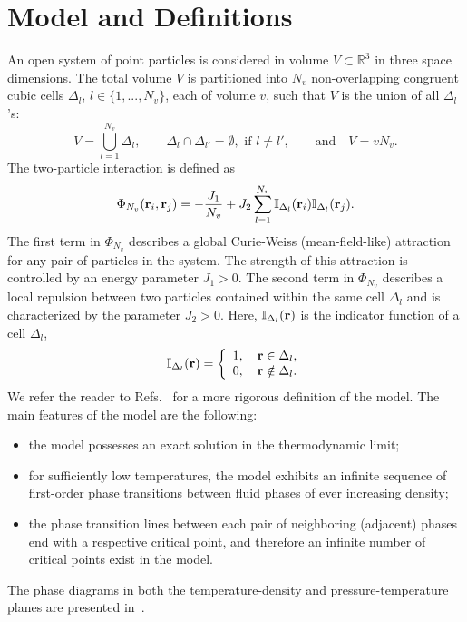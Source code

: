 \documentclass[entropy,article,submit,pdftex,moreauthors]{Definitions/mdpi}
\begin{document}
\section{Model and Definitions}
\label{sec:model}
An open system of point particles is considered in volume $V\subset\mathbb R^3$ in three space dimensions. The total volume $V$ is partitioned into $N_v$ non-overlapping congruent cubic cells $\Delta_l$, $l\in\{1,...,N_v\}$, each of volume $v$, such that $V$ is the union of all $\Delta_l$'s:
\begin{equation}\label{volume}
	V = \bigcup_{l=1}^{N_v}\Delta_l,\qquad
	\Delta_l \cap \Delta_{l'} = \emptyset, \text{ if } l \neq l',\qquad\mbox{and}\quad
	V = v N_v.
\end{equation}
The two-particle interaction is defined as
\begin{equation}
	\label{def:curie-weiss-pot}
	\Phi_{N_v}(\vb{r}_i, \vb{r}_j) = -\frac{J_1}{N_v} + J_2\sum_{l=1}^{N_v} \mathbb{I}_{\Delta_l}(\vb{r}_i) \mathbb{I}_{\Delta_l}(\vb{r}_j).
\end{equation}
The first term in $\Phi_{N_v}$ describes a global Curie-Weiss (mean-field-like) attraction for any pair of particles in the system.
The strength of this attraction is controlled by an energy parameter $J_1 > 0$. The second term in $\Phi_{N_v}$ describes a local repulsion between two particles contained within the same cell $\Delta_l$ and is characterized by the parameter $J_2 > 0.$
Here, $\mathbb{I}_{\Delta_l}(\vb{r})$ is the indicator function of a cell $\Delta_l$,
\begin{equation}
	\label{def:I}
	\mathbb{I}_{\Delta_l} (\vb{r}) = \left\{
	\begin{array}{ll}
		1, \quad \vb{r} \in \Delta_l,
		\\
		0, \quad \vb{r} \notin \Delta_l.
	\end{array}
	\right.
\end{equation}
We refer the reader to Refs.~\citep{KKD20,KD22,RDKPS25arxiv} for a more rigorous definition of the model. The main features of the model are the following:
\begin{itemize}
	\item the model possesses an exact solution in the thermodynamic limit;
	
	\item for sufficiently low temperatures, the model exhibits an infinite sequence of first-order phase transitions between fluid phases of ever increasing density;
	
	\item the phase transition lines between each pair of neighboring (adjacent) phases end with a respective critical point, and therefore an infinite number of critical points exist in the model.
	
\end{itemize}
The phase diagrams in both the temperature-density and pressure-temperature planes are presented in~\citep{KD22}.
\end{document}
